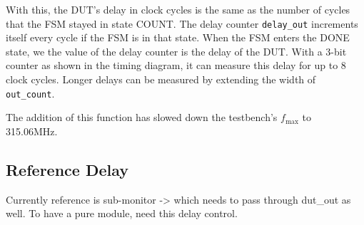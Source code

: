 With this, the DUT's delay in clock cycles is the same as the number of cycles that the FSM stayed in state COUNT.
The delay counter \texttt{delay\_out} increments itself every cycle if the FSM is in that state.
When the FSM enters the DONE state, we the value of the delay counter is the delay of the DUT.
With a 3-bit counter as shown in the timing diagram, it can measure this delay for up to 8 clock cycles.
Longer delays can be measured by extending the width of \texttt{out\_count}.


The addition of this function has slowed down the testbench's $f_\text{max}$ to 315.06MHz.

\subsection{Reference Delay}
Currently reference is sub-monitor -> which needs to pass through dut\_out as well.
To have a pure module, need this delay control.